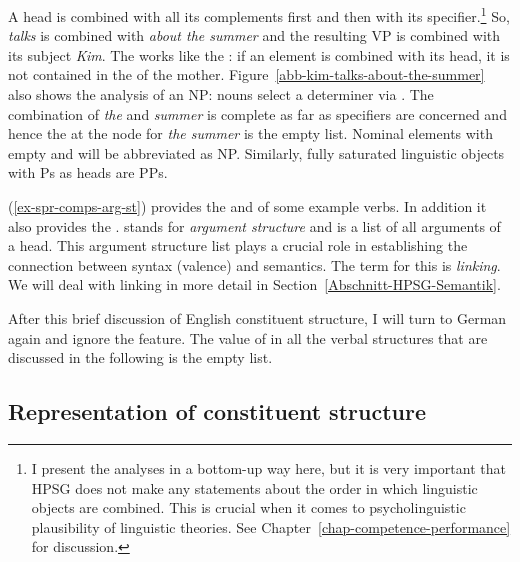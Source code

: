 A head is combined with all its complements first and then with its specifier.\footnote{%
  I present the analyses in a bottom-up way here, but it is very important that HPSG does not make
  any statements about the order in which linguistic objects are combined. This is crucial when it
  comes to psycholinguistic plausibility of linguistic theories. See Chapter~\ref{chap-competence-performance} for discussion.%
} So, \emph{talks} is combined with \emph{about the summer} and the resulting VP is combined with
its subject \emph{Kim}. The \sprl works like the \compsl: if an element is combined with its head,
it is not contained in the \sprl of the mother. Figure~\ref{abb-kim-talks-about-the-summer} also
shows the analysis of an NP: nouns select a determiner via \spr. The combination of \emph{the} and
\emph{summer} is complete as far as specifiers are concerned and hence the \sprl at the node for
\emph{the summer} is the empty list. Nominal elements with empty \sprl and \compsl will be
abbreviated as NP. Similarly, fully saturated linguistic objects with Ps as heads are PPs.

(\ref{ex-spr-comps-arg-st}) provides the \spr and \compsvs of some example verbs. In addition it
also provides the \argstv. \argst{} stands for \emph{argument structure} and is a list of all
arguments of a head. This argument structure list plays a crucial role in establishing the
connection between syntax (valence) and semantics. The term for this is
\emph{linking}. We will deal with linking in more detail in Section~\ref{Abschnitt-HPSG-Semantik}.

After this brief discussion of English constituent structure, I will turn to German again and ignore
the \spr feature. The value of \spr in all the verbal structures that are discussed in the following is the
empty list.

\subsection{Representation of constituent structure}
\label{sec-HPSG-constituent-structure}

